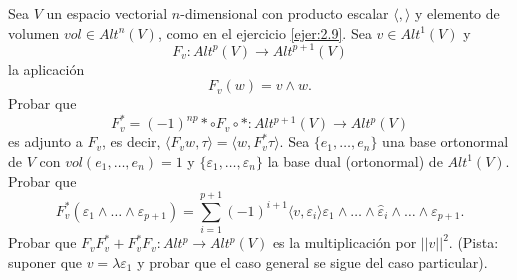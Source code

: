 \documentclass[twoside]{article}
\begin{document}
\begin{ejercicio}{2.11}
Sea $V$ un espacio vectorial $n$-dimensional con producto escalar $\langle,\rangle$ y elemento de volumen $vol\in Alt^n(V)$, como en el ejercicio \ref{ejer:2.9}. Sea $v\in Alt^1(V)$ y
\[
F_v:Alt^p(V)\to Alt^{p+1}(V)
\]
la aplicación
\[
F_v(w)=v\land w.
\]
Probar que 
\[
F^*_v=(-1)^{np}*\circ F_v\circ *: Alt^{p+1}(V)\to Alt^p(V)
\]
es adjunto a $F_v$, es decir, $\langle F_vw,\tau\rangle=\langle w,F^*_v\tau\rangle$. Sea $\{e_1,\dots, e_n\}$ una base ortonormal de $V$ con $vol(e_1,\dots,e_n)=1$ y $\{\varepsilon_1,\dots,\varepsilon_n\}$ la base dual (ortonormal) de $Alt^1(V)$. Probar que
\[
F^*_v(\varepsilon_1\land\dots\land\varepsilon_{p+1})=\sum_{i=1}^{p+1}(-1)^{i+1}\langle v,\varepsilon_i\rangle\varepsilon_1\land\dots\land\hat{\varepsilon}_i\land\dots\land\varepsilon_{p+1}.
\]
Probar que $F_vF^*_v+F^*_vF_v:Alt^p\to Alt^p(V)$ es la multiplicación por $||v||^2$. (Pista: suponer que $v=\lambda\varepsilon_1$ y probar que el caso general se sigue del caso particular).
\end{ejercicio}
\end{document}
